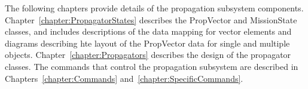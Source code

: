 The following chapters provide details of the propagation subsystem components.
Chapter~\ref{chapter:PropagatorStates} describes the PropVector and MissionState classes, and
includes descriptions of the data mapping for vector elements and diagrams describing hte layout of
the PropVector data for single and multiple objects.  Chapter~\ref{chapter:Propagators} describes
the design of the propagator classes.  The commands that control the propagation subsystem are
described in Chapters~\ref{chapter:Commands} and~\ref{chapter:SpecificCommands}.


%
%
%
%
%
%
%
%
%

